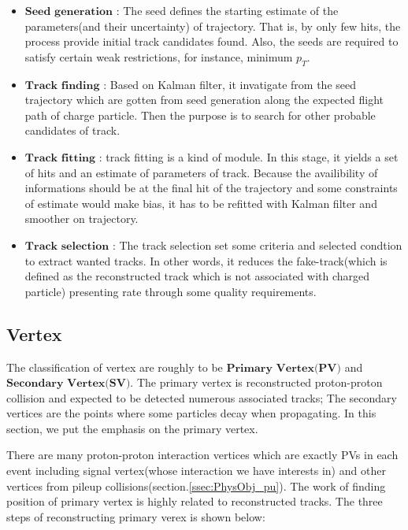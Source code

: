 		\begin{itemize}
			\item $\textbf{Seed generation}$ : The seed defines the starting estimate of the parameters(and their uncertainty) of trajectory. That is, by only few hits, the process provide initial track candidates found. Also, the seeds are required to satisfy certain weak restrictions, for instance, minimum $p_T$.
			\item $\textbf{Track finding}$ : Based on Kalman filter, it invatigate from the seed trajectory which are gotten from seed generation along the expected flight path of charge particle. Then the purpose is to search for other probable candidates of track.
			\item $\textbf{Track fitting}$ : track fitting is a kind of module. In this stage, it yields a set of hits and an estimate of parameters of track. Because the availibility of informations should be at the final hit of the trajectory and some constraints of estimate would make bias, it has to be refitted with Kalman filter and smoother on trajectory.
			\item $\textbf{Track selection}$ : The track selection set some criteria and selected condtion to extract wanted tracks. In other words, it reduces the fake-track(which is defined as the reconstructed track which is not associated with charged particle) presenting rate through some quality requirements.
		\label{PhysObj:itm:track_reco}
		\end{itemize}

	\subsection{Vertex}
	\label{ssec:PhysObj_vertex}

		The classification of vertex are roughly to be $\textbf{Primary Vertex(PV)}$ and $\textbf{Secondary Vertex(SV)}$. The primary vertex is reconstructed proton-proton collision and expected to be detected numerous associated tracks; The secondary vertices are the points where some particles decay when propagating. In this section, we put the emphasis on the primary vertex.

		There are many proton-proton interaction vertices which are exactly PVs in each event including signal vertex(whose interaction we have interests in) and other vertices from pileup collisions(section.\ref{ssec:PhysObj_pu}). The work of finding position of primary vertex is highly related to reconstructed tracks. The three steps of reconstructing primary verex is shown below:

